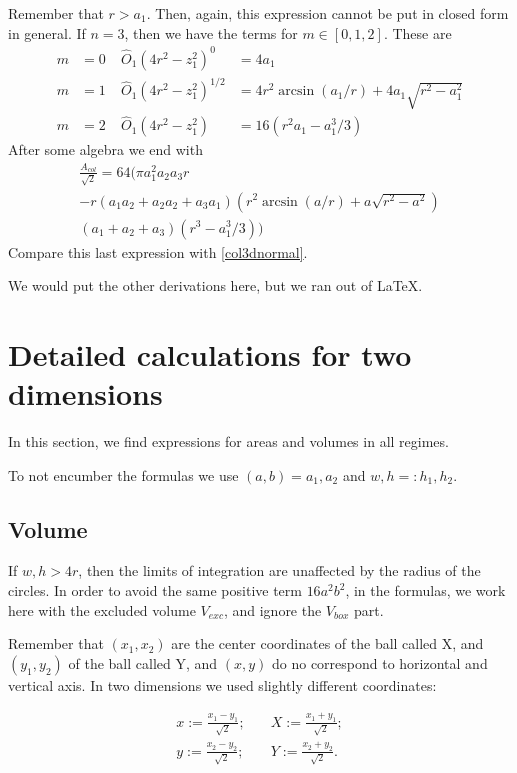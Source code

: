 \documentclass[superscriptaddress,pre,reprint,showpacs,twocolumn]{revtex4-1}
\newcommand{\defeq}{:=}
\begin{document}
Remember that  $r>a_1$. Then, again,
this expression cannot be put in closed form in general. If $n=3$, then we have
the terms for $m \in [0, 1, 2] $. These are
\begin{align}
  m&=0 \; & \hat{O}_1 (4r^2-z_1^2)^0 &= 4 a_1 \\
  m&=1 \; &\hat{O}_1 (4r^2-z_1^2)^{1/2} &= 4r^2 \arcsin(a_1/r) + 4a_1 \sqrt{r^2-a_1^2} \\
  m&=2 \; &\hat{O}_1 (4r^2-z_1^2) &= 16(r^2a_1 -a_1^3/3)
\end{align}
After some algebra we end with
\begin{equation}
  \begin{split}
    \frac{A_{col}}{\sqrt{2}}=64 \bigr( \pi a_1^2a_2 a_3 r \\
    - r (a_1 a_2 +a_2a_2 +a_3a_1)(r^2 \arcsin(a/r) + a\sqrt{r^2-a^2}) \\
    (a_1+a_2+a_3)(r^3-a_1^3/3)
    \bigl)
  \end{split}
\end{equation}
Compare this last expression with \ref{col3dnormal}.

We would put the other derivations here, but we ran out of \LaTeX.


\section{Detailed calculations for two dimensions}
\label{app:area_volume2d}

In this section, we find expressions for areas and volumes in all 
regimes.

To not encumber  the formulas we use  $(a , b)  = a_1 , a_2 $
and $w,h =: h_1, h_2 $.


\subsection{Volume}\label{app:volume2d}


If $w, h > 4r$, then the limits of integration
are unaffected by the radius of the circles.
In order to avoid the same positive term $16a^2b^2$, 
in the formulas, we work here with
the excluded volume $V_{exc}$, and ignore the  $V_{box}$ part.

Remember that $(x_1, x_2)$ are the center coordinates of the
ball called X, and $(y_1, y_2)$ of the ball called Y,
and $(x,y)$  do no correspond to horizontal and vertical axis.
In two dimensions we used slightly different coordinates:

\begin{equation}\label{cambiocoor2d}
  \begin{split}
 x  \defeq \frac{x_1 - y_1}{\sqrt{2}};  &
\quad X  \defeq \frac{x_1 + y_1}{\sqrt{2}};  \\
 y  \defeq \frac{x_2 - y_2}{\sqrt{2}}; & 
\quad Y  \defeq \frac{x_2 + y_2}{\sqrt{2}}.
  \end{split}
\end{equation}
\end{document}
